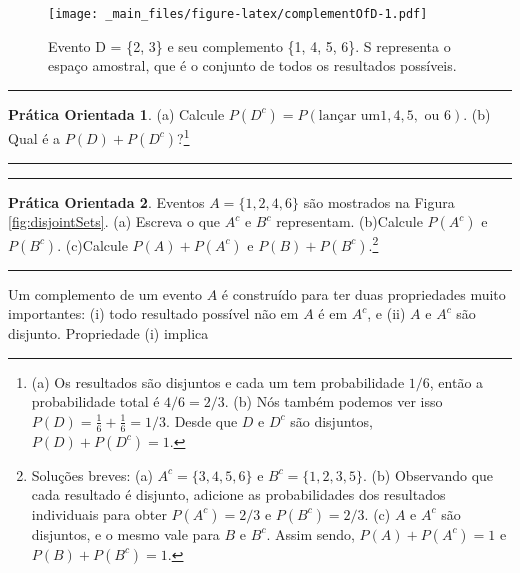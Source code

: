 \documentclass[
]{book}
\theoremstyle{definition}
\theoremstyle{definition}
\theoremstyle{definition}
\newtheorem{exercise}{Prática Orientada}[chapter]
\theoremstyle{definition}
\theoremstyle{remark}
\begin{document}
\begin{figure}
\centering
\texttt{[image: \_main\_files/figure-latex/complementOfD-1.pdf]}
\caption{\label{fig:complementOfD}Evento D = \{2, 3\} e seu complemento \{1, 4, 5, 6\}. S representa o espaço amostral, que é o conjunto de todos os resultados possíveis.}
\end{figure}

\begin{center}\rule{0.5\linewidth}{0.5pt}\end{center}

\begin{exercise}
\protect\hypertarget{exr:unnamed-chunk-51}{}{\label{exr:unnamed-chunk-51} }(a) Calcule \(P(D^c) = P(\text{lançar um} 1, 4, 5,\text{ ou }6)\).
(b) Qual é a \(P(D) + P(D^c)\)?\footnote{(a) Os resultados são disjuntos e cada um tem probabilidade \(1/6\), então a probabilidade total é \(4/6 = 2/3\). (b) Nós também podemos ver isso \(P(D)=\frac{1}{6} + \frac{1}{6} = 1/3\). Desde que \(D\) e \(D^c\) são disjuntos, \(P(D) + P(D^c) = 1\).}
\end{exercise}

\begin{center}\rule{0.5\linewidth}{0.5pt}\end{center}

\begin{center}\rule{0.5\linewidth}{0.5pt}\end{center}

\begin{exercise}
\protect\hypertarget{exr:unnamed-chunk-52}{}{\label{exr:unnamed-chunk-52} }Eventos \(A=\{1, 2, 4, 6\}\) são mostrados na Figura \ref{fig:disjointSets}.
(a) Escreva o que \(A^c\) e \(B^c\) representam.
(b)Calcule \(P(A^c)\) e \(P(B^c)\).
(c)Calcule \(P(A)+P(A^c)\) e \(P(B)+P(B^c)\).\footnote{Soluções breves: (a) \(A^c = \{3, 4, 5, 6\}\) e \(B^c=\{1,2,3,5\}\). (b) Observando que cada resultado é disjunto, adicione as probabilidades dos resultados individuais para obter \(P(A^c)=2/3\) e \(P(B^c)=2/3\). (c) \(A\) e \(A^c\) são disjuntos, e o mesmo vale para \(B\) e \(B^c\). Assim sendo, \(P(A) + P(A^c) = 1\) e \(P(B) + P(B^c) = 1\).}
\end{exercise}

\begin{center}\rule{0.5\linewidth}{0.5pt}\end{center}

Um complemento de um evento \(A\) é construído para ter duas propriedades muito importantes: (i) todo resultado possível não em \(A\) é em \(A^c\), e (ii) \(A\) e \(A^c\) são disjunto. Propriedade (i) implica
\end{document}
